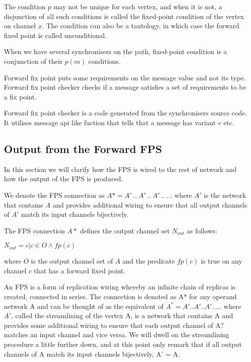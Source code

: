 The condition $p$ may not be unique for each vertex, and when it is not, a disjunction of all such conditions is called the fixed-point condition of the vertex on channel $x$. The condition can also be a tautology, in which case the forward fixed point is called unconditional.


When we have several synchronisers on the path, fixed-point condition is a conjunction of their $p(m)$ conditions.




Forward fix point puts some requirements on the message value and not its type.
Forward fix point checker checks if a message satisfies a set of requirements to be a fix point.

Forward fix point checker is a code generated from the synchronisers source code. It utilises message api like fuction that tells that a message has variant $v$ etc.



    \subsection{Output from the Forward FPS}
In this section we will clarify how the FPS is wired to the rest of network and how the output of the FPS is produced.

We denote the FPS connection as $A* = A' \: .. \: A' \: .. \: A' \: .. \: \dots$ where $A'$ is the network that contains $A$ and provides additional wiring to ensure that all output channels of $A'$ match its input channels bijectively.

The FPS connection $A*$ defines the output channel set $N_{out}$ as follows:

$N_{out} = { c | c \in O \land fp(c) }$

where $O$ is the output channel set of $A$ and the predicate $fp(c)$ is true on any channel $c$ that has a forward fixed point.


An FPS is a form of replication wiring whereby an infinite chain of replicas is created, connected
in series. The connection is denoted as A* for any operand network A and can be thought of as the equivalent of
$A^* = A'..A'..A'.. \dots$
where $A'$, called the streamlining of the vertex A, is a network that contains A and provides some additional wiring to ensure that each output channel of A? matches an input channel and vice versa. We will dwell on the streamlining procedure a little further down, and at this point only remark that if all output channels of A match its input channels bijectively, A' = A.

